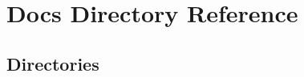 \section{Docs Directory Reference}
\label{dir_5baf679cf4943df8904dce5d41d4d3dc}
\subsection*{Directories}
\begin{DoxyCompactItemize}
\end{DoxyCompactItemize}
